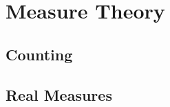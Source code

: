 \documentclass[../../textbook.tex]{subfiles}
\begin{document}
\part{Measure Theory}
\chapter{Counting}


\chapter{Real Measures}

\end{document}
